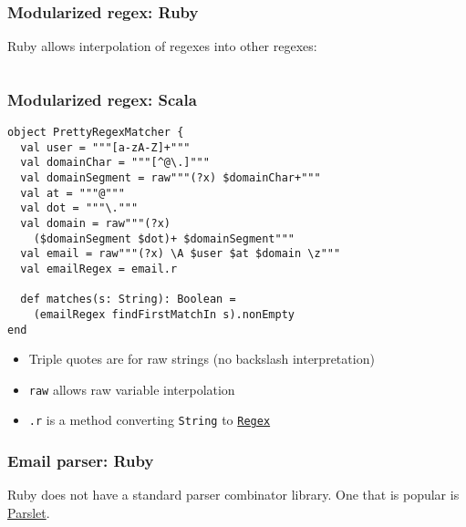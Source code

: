 %


%
%


\begin{frame}[fragile]
  \frametitle{Modularized regex: Ruby}

  Ruby allows interpolation of regexes into other regexes:

  \inputminted{ruby}{ruby/lib/email_validator/pretty_regex_matcher.rb}
\end{frame}

\begin{frame}[fragile]
  \frametitle{Modularized regex: Scala}

  \begin{verbatim}
object PrettyRegexMatcher {
  val user = """[a-zA-Z]+"""
  val domainChar = """[^@\.]"""
  val domainSegment = raw"""(?x) $domainChar+"""
  val at = """@"""
  val dot = """\."""
  val domain = raw"""(?x)
    ($domainSegment $dot)+ $domainSegment"""
  val email = raw"""(?x) \A $user $at $domain \z"""
  val emailRegex = email.r

  def matches(s: String): Boolean =
    (emailRegex findFirstMatchIn s).nonEmpty
end
  \end{verbatim}

  \begin{itemize}
    \item Triple quotes are for raw strings (no backslash interpretation)
    \item \texttt{raw} allows raw variable interpolation
    \item \texttt{.r} is a method converting \texttt{String} to \href{http://www.scala-lang.org/api/current/index.html#scala.util.matching.Regex}{\texttt{Regex}}
  \end{itemize}
\end{frame}


\begin{frame}[fragile]
  \frametitle{Email parser: Ruby}

  Ruby does not have a standard parser combinator library. One that is popular is \href{http://kschiess.github.io/parslet/}{Parslet}.

  \inputminted{ruby}{ruby/lib/email_validator/parser.rb}
\end{frame}

